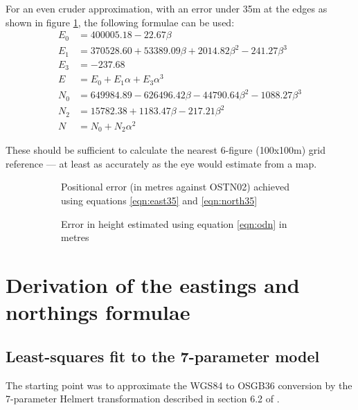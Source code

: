 \documentclass[10pt,a4paper]{article}
\def\tkname#1{}
\def\gap{\hspace{2cm}}
\begin{document}
For an even cruder approximation, with an error under 35m at the edges
as shown in figure \ref{fig:35-metre-model}, the following formulae can be
used:
\begin{align}
E_0 &= 400005.18 -22.67\beta\nonumber \\
E_1 &= 370528.60 +53389.09\beta +2014.82\beta^2 -241.27\beta^3\nonumber \\
E_3 &= -237.68\nonumber \\
E &= E_0 +E_1\alpha +E_3\alpha^3
  \label{eqn:east35}
\\[2ex]
N_0 &= 649984.89 -626496.42\beta -44790.64\beta^2 -1088.27\beta^3\nonumber \\
N_2 &= 15782.38 +1183.47\beta -217.21\beta^2\nonumber \\
N &= N_0 +N_2\alpha^2
  \label{eqn:north35}
\end{align}

These should be sufficient to calculate the nearest 6-figure (100x100m) grid
reference --- at least as accurately as the eye would estimate from a map.

\begin{figure}[htb]
  \begin{subfigure}[b]{0.4\textwidth}
    \tkname{35-metre-model}
  \centering
  \fbox{
    
  }
  \caption{Positional error (in metres against OSTN02) achieved using equations \eqref{eqn:east35} and \eqref{eqn:north35}}
  \label{fig:35-metre-model}
  \end{subfigure}
\gap
  \begin{subfigure}[b]{0.4\textwidth}
    \tkname{odn_base}
  \centering
  \fbox{
    
  }
  \caption{Error in height estimated using equation \eqref{eqn:odn} in metres}
  \label{fig:odn_base}
  \end{subfigure}
\caption{}
\hrulefill
\end{figure}

\section {Derivation of the eastings and northings formulae}
\subsection {Least-squares fit to the 7-parameter model}
\label{sec:lsq_helmert}
The starting point was to approximate the WGS84 to OSGB36 conversion by the
7-parameter Helmert transformation described in section 6.2 of \cite{gcs}.
\end{document}
